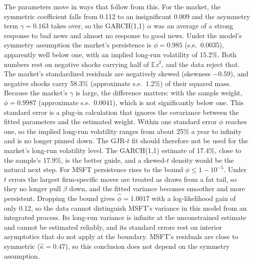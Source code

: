 \documentclass[11pt]{article}
\newcommand{\E}{\mathbb{E}}
\newcommand{\1}{\mathbf{1}}
\begin{document}
The parameters move in ways that follow from this. For the market, the symmetric coefficient
falls from 0.112 to an insignificant 0.009 and the asymmetry term $\gamma=0.163$ takes over,
so the GARCH(1,1) $\alpha$ was an average of a strong response to bad news and almost no
response to good news. Under the model's symmetry assumption the market's persistence is
$\phi=0.985$ (s.e.\ 0.0035), apparently well below one, with an implied long-run volatility of
15.2\%. Both numbers rest on negative shocks carrying half of $\E z^2$, and the data reject
that. The market's standardized residuals are negatively skewed (skewness $-0.59$), and
negative shocks carry 58.3\% (approximate s.e.\ 1.2\%) of their squared mass. Because the
market's $\gamma$ is large, the difference matters: with the sample weight, $\phi=0.9987$
(approximate s.e.\ 0.0041), which is not significantly below one. This standard error is a
plug-in calculation that ignores the covariance between the fitted parameters and the
estimated weight. Within one standard error $\phi$ reaches one, so the implied long-run
volatility ranges from about 25\% a year to infinity and is no longer pinned down. The GJR-$t$ fit should therefore not be used for the market's long-run
volatility level. The GARCH(1,1) estimate of 17.4\%, close to the sample's 17.9\%, is the
better guide, and a skewed-$t$ density would be the natural next step. For MSFT persistence
rises to the bound $\phi\le1-10^{-5}$. Under $t$ errors the largest
firm-specific moves are treated as draws from a fat tail, so they no longer pull $\beta$ down,
and the fitted variance becomes smoother and more persistent. Dropping the bound gives
$\hat\phi=1.0017$ with a log-likelihood gain of only 0.12, so the data cannot distinguish
MSFT's variance in this model from an integrated process. Its long-run variance is infinite at
the unconstrained estimate and cannot be estimated reliably, and its standard errors rest on
interior asymptotics that do not apply at the boundary. MSFT's residuals are close to
symmetric ($\hat\kappa=0.47$), so this conclusion does not depend on the symmetry assumption.
\end{document}
